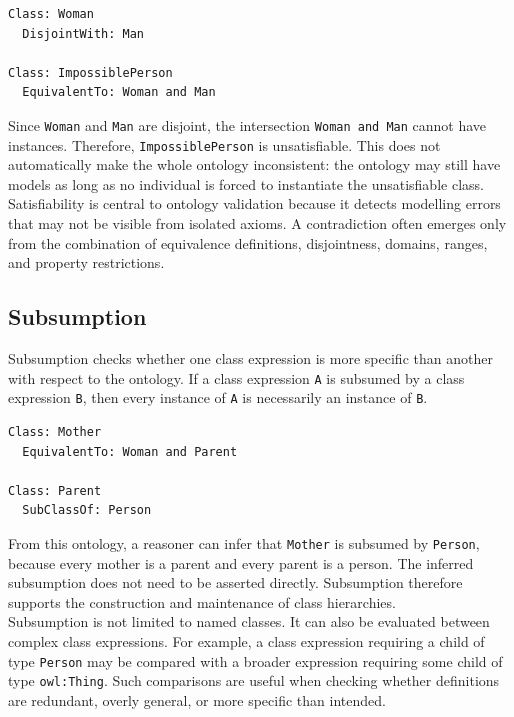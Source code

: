 \documentclass{scrbook}
\begin{document}
	\begin{lstlisting}
Class: Woman
  DisjointWith: Man

Class: ImpossiblePerson
  EquivalentTo: Woman and Man
	\end{lstlisting}
	
	Since \texttt{Woman} and \texttt{Man} are disjoint, the intersection \texttt{Woman and Man} cannot have instances. Therefore, \texttt{ImpossiblePerson} is unsatisfiable. This does not automatically make the whole ontology inconsistent: the ontology may still have models as long as no individual is forced to instantiate the unsatisfiable class.\\
	
	Satisfiability is central to ontology validation because it detects modelling errors that may not be visible from isolated axioms. A contradiction often emerges only from the combination of equivalence definitions, disjointness, domains, ranges, and property restrictions.
	
	\subsection{Subsumption}
	
	Subsumption checks whether one class expression is more specific than another with respect to the ontology. If a class expression \texttt{A} is subsumed by a class expression \texttt{B}, then every instance of \texttt{A} is necessarily an instance of \texttt{B}.
	
	\begin{lstlisting}
Class: Mother
  EquivalentTo: Woman and Parent

Class: Parent
  SubClassOf: Person
	\end{lstlisting}
	
	From this ontology, a reasoner can infer that \texttt{Mother} is subsumed by \texttt{Person}, because every mother is a parent and every parent is a person. The inferred subsumption does not need to be asserted directly. Subsumption therefore supports the construction and maintenance of class hierarchies.\\
	
	Subsumption is not limited to named classes. It can also be evaluated between complex class expressions. For example, a class expression requiring a child of type \texttt{Person} may be compared with a broader expression requiring some child of type \texttt{owl:Thing}. Such comparisons are useful when checking whether definitions are redundant, overly general, or more specific than intended.
	
\end{document}
